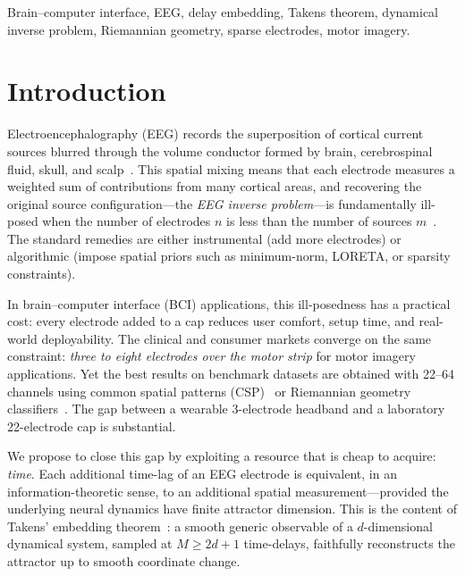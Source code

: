 \documentclass[journal]{IEEEtran}
\begin{document}
\IEEEpeerreviewmaketitle

\begin{IEEEkeywords}
Brain--computer interface, EEG, delay embedding, Takens theorem, dynamical inverse problem, Riemannian geometry, sparse electrodes, motor imagery.
\end{IEEEkeywords}

\section{Introduction}
\label{sec:intro}

Electroencephalography (EEG) records the superposition of cortical current sources blurred through the volume conductor formed by brain, cerebrospinal fluid, skull, and scalp~\cite{nunez1994}. This spatial mixing means that each electrode measures a weighted sum of contributions from many cortical areas, and recovering the original source configuration---the \emph{EEG inverse problem}---is fundamentally ill-posed when the number of electrodes $n$ is less than the number of sources $m$~\cite{lotte2018}. The standard remedies are either instrumental (add more electrodes) or algorithmic (impose spatial priors such as minimum-norm, LORETA, or sparsity constraints).

In brain--computer interface (BCI) applications, this ill-posedness has a practical cost: every electrode added to a cap reduces user comfort, setup time, and real-world deployability. The clinical and consumer markets converge on the same constraint: \emph{three to eight electrodes over the motor strip} for motor imagery applications. Yet the best results on benchmark datasets are obtained with 22--64 channels using common spatial patterns (CSP)~\cite{blankertz2007} or Riemannian geometry classifiers~\cite{barachant2012,congedo2017}. The gap between a wearable 3-electrode headband and a laboratory 22-electrode cap is substantial.

We propose to close this gap by exploiting a resource that is cheap to acquire: \emph{time}. Each additional time-lag of an EEG electrode is equivalent, in an information-theoretic sense, to an additional spatial measurement---provided the underlying neural dynamics have finite attractor dimension. This is the content of Takens' embedding theorem~\cite{takens1981}: a smooth generic observable of a $d$-dimensional dynamical system, sampled at $M \geq 2d+1$ time-delays, faithfully reconstructs the attractor up to smooth coordinate change.
\end{document}
